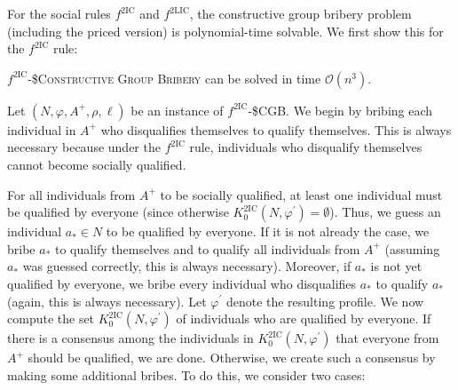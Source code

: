 \documentclass[
    12pt,               %
    a4paper,            %
    bibtotoc,           %
    pointlessnumbers,   %
    ngerman,            %
    titlepage,          %
    leqno,              %
    ]{scrarticle}       %
\begin{document}
For the social rules $f^{\text{2IC}}$ and $f^{\text{2LIC}}$, the constructive group bribery problem (including the priced version) is polynomial-time solvable. We first show this for the $f^{\text{2IC}}$ rule:

\begin{Theorem} \label{thm:2ic_cgb_p}
$f^{\text{2IC}}$-\textsc{\$Constructive Group Bribery} can be solved in time $\mathcal{O}(n^3)$.
\end{Theorem}

\begin{Proof}
Let $(N, \varphi, A^+, \rho, \ell)$ be an instance of $f^{\text{2IC}}$-\$CGB. We begin by bribing each individual in $A^+$ who disqualifies themselves to qualify themselves. This is always necessary because under the $f^{\text{2IC}}$ rule, individuals who disqualify themselves cannot become socially qualified.

For all individuals from $A^+$ to be socially qualified, at least one individual must be qualified by everyone (since otherwise $K^{\text{2IC}}_0(N, \varphi^\prime) = \emptyset$). Thus, we guess an individual $a_\ast \in N$ to be qualified by everyone. If it is not already the case, we bribe $a_\ast$ to qualify themselves and to qualify all individuals from $A^+$ (assuming $a_\ast$ was guessed correctly, this is always necessary). Moreover, if $a_\ast$ is not yet qualified by everyone, we bribe every individual who disqualifies $a_\ast$ to qualify $a_\ast$ (again, this is always necessary). Let $\varphi^\prime$ denote the resulting profile. We now compute the set $K^{\text{2IC}}_0(N, \varphi^\prime)$ of individuals who are qualified by everyone. If there is a consensus among the individuals in $K^{\text{2IC}}_0(N, \varphi^\prime)$ that everyone from $A^+$ should be qualified, we are done. Otherwise, we create such a consensus by making some additional bribes. To do this, we consider two cases:


\end{Proof}
\end{document}
